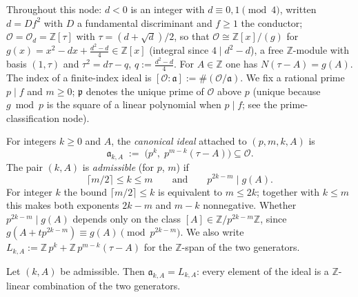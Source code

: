 %

Throughout this node: $d < 0$ is an integer with $d \equiv 0, 1 \pmod 4$, written
$d = D f^2$ with $D$ a fundamental discriminant and $f \ge 1$ the conductor;
$\mathcal{O} = \mathcal{O}_d = \mathbb{Z}[\tau]$ with $\tau = (d + \sqrt d)/2$, so that
$\mathcal{O} \cong \mathbb{Z}[x]/(g)$ for
$g(x) = x^2 - dx + \tfrac{d^2 - d}{4} \in \mathbb{Z}[x]$ (integral since
$4 \mid d^2 - d$), a free $\mathbb{Z}$-module with basis $(1, \tau)$ and
$\tau^2 = d\tau - q$, $q := \tfrac{d^2-d}{4}$. For $A \in \mathbb{Z}$ one has
$N(\tau - A) = g(A)$. The index of a finite-index ideal is
$[\mathcal{O} : \mathfrak{a}] := \#(\mathcal{O}/\mathfrak{a})$. We fix a rational
prime $p \mid f$ and $m \ge 0$; $\mathfrak{p}$ denotes the unique prime of
$\mathcal{O}$ above $p$ (unique because $g \bmod p$ is the square of a linear
polynomial when $p \mid f$; see the prime-classification node).

\begin{definition}
  \label{lem-3-2-4-def}
  For integers $k \ge 0$ and $A$, the \emph{canonical ideal} attached to
  $(p, m, k, A)$ is
  \[
    \mathfrak{a}_{k,A} \;:=\; \bigl(p^k,\; p^{m-k}(\tau - A)\bigr) \subseteq \mathcal{O}.
  \]
  The pair $(k, A)$ is \emph{admissible} (for $p$, $m$) if
  \[
    \lceil m/2 \rceil \le k \le m
    \qquad\text{and}\qquad
    p^{2k-m} \mid g(A).
  \]
  For integer $k$ the bound $\lceil m/2\rceil \le k$ is equivalent to $m \le 2k$;
  together with $k \le m$ this makes both exponents $2k - m$ and $m - k$
  nonnegative. Whether $p^{2k-m} \mid g(A)$
  depends only on the class $[A] \in \mathbb{Z}/p^{2k-m}\mathbb{Z}$, since
  $g(A + tp^{2k-m}) \equiv g(A) \pmod{p^{2k-m}}$. We also write
  $L_{k,A} := \mathbb{Z}\,p^k + \mathbb{Z}\,p^{m-k}(\tau - A)$ for the
  $\mathbb{Z}$-span of the two generators.
\end{definition}

\begin{lemma}
  \label{lem-3-2-4-zspan}
  Let $(k, A)$ be admissible. Then $\mathfrak{a}_{k,A} = L_{k,A}$: every element
  of the ideal is a $\mathbb{Z}$-linear combination of the two generators.
\end{lemma}

